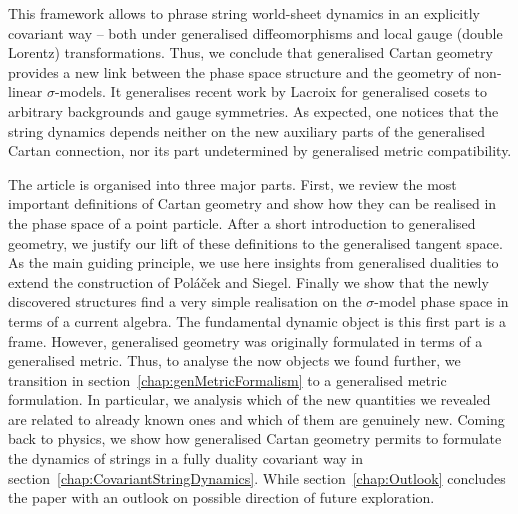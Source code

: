 \documentclass[11pt,a4paper]{article}
\numberwithin{equation}{section}
\begin{document}
This framework allows to phrase string world-sheet dynamics in an explicitly covariant way -- both under generalised diffeomorphisms and local gauge (double Lorentz) transformations. Thus, we conclude that generalised Cartan geometry provides a new link between the phase space structure and the geometry of non-linear $\sigma$-models. It generalises recent work by Lacroix \cite{Lacroix:2023ybi} for generalised cosets to arbitrary backgrounds and gauge symmetries. As expected, one notices that the string dynamics depends neither on the new auxiliary parts of the generalised Cartan connection, nor its part undetermined by generalised metric compatibility.

The article is organised into three major parts. First, we review the most important definitions of Cartan geometry and show how they can be realised in the phase space of a point particle. After a short introduction to generalised geometry, we justify our lift of these definitions to the generalised tangent space. As the main guiding principle, we use here insights from generalised dualities to extend the construction of Poláček and Siegel. Finally we show that the newly discovered structures find a very simple realisation on the $\sigma$-model phase space in terms of a current algebra. The fundamental dynamic object is this first part is a frame. However, generalised geometry was originally formulated in terms of a generalised metric. Thus, to analyse the now objects we found further, we transition in section~\ref{chap:genMetricFormalism} to a generalised metric formulation. In particular, we analysis which of the new quantities we revealed are related to already known ones and which of them are genuinely new. Coming back to physics, we show how generalised Cartan geometry permits to formulate the dynamics of strings in a fully duality covariant way in section~\ref{chap:CovariantStringDynamics}. While section~\ref{chap:Outlook} concludes the paper with an outlook on possible direction of future exploration.
\end{document}
